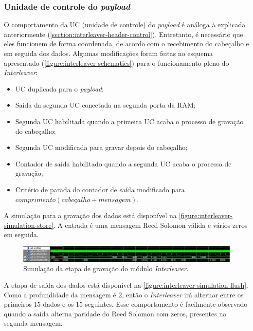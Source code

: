 	\subsubsection{Unidade de controle do \textit{payload}}
	
	O comportamento da UC (unidade de controle) do \textit{payload} é análoga à explicada anteriormente (\autoref{section:interleaver-header-control}). Entretanto, é necessário que eles funcionem de forma coordenada, de acordo com o recebimento do cabeçalho e em seguida dos dados. Algumas modificações foram feitas no esquema apresentado (\autoref{figure:interleaver-schematics}) para o funcionamento pleno do \textit{Interleaver}: 
	
	\begin{itemize}
		\item UC duplicada para o \textit{payload};
		\item Saída da segunda UC conectada na segunda porta da RAM;
		\item Segunda UC habilitada quando a primeira UC acaba o processo de gravação do cabeçalho;
		\item Segunda UC modificada para gravar depois do cabeçalho;
		\item Contador de saída habilitado quando a segunda UC acaba o processo de gravação;
		\item Critério de parada do contador de saída modificado para $comprimento(cabeçalho + mensagem)$.
	\end{itemize}
	
	A simulação para a gravação dos dados está disponível na \autoref{figure:interleaver-simulation-store}. A entrada é uma mensagem Reed Solomon válida e vários zeros em seguida.
	\begin{figure}[h]
		\caption{\label{figure:interleaver-simulation-store}Simulação da etapa de gravação do módulo \textit{Interleaver}.}
		\centering
		\includegraphics[width=1\textwidth]{interleaver/simulation-store.png}
	\end{figure}

	A etapa de saída dos dados está disponível na \autoref{figure:interleaver-simulation-flush}. Como a profundidade da mensagem é 2, então o \textit{Interleaver} irá alternar entre os primeiros 15 dados e os 15 seguintes. Esse comportamento é facilmente observado quando a saída alterna paridade do Reed Solomon com zeros, presentes na segunda mensagem.
	
